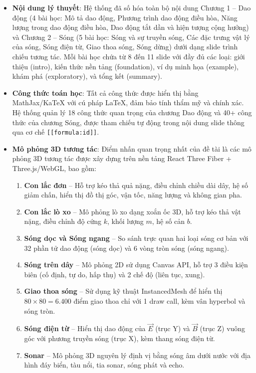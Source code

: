 \begin{itemize}
    \item \textbf{Nội dung lý thuyết}: Hệ thống đã số hóa toàn bộ nội dung Chương 1 – Dao động (4 bài học: Mô tả dao động, Phương trình dao động điều hòa, Năng lượng trong dao động điều hòa, Dao động tắt dần và hiện tượng cộng hưởng) và Chương 2 – Sóng (5 bài học: Sóng và sự truyền sóng, Các đặc trưng vật lý của sóng, Sóng điện từ, Giao thoa sóng, Sóng dừng) dưới dạng slide trình chiếu tương tác. Mỗi bài học chứa từ 8 đến 11 slide với đầy đủ các loại: giới thiệu (intro), kiến thức nền tảng (foundation), ví dụ minh họa (example), khám phá (exploratory), và tổng kết (summary).
    
    \item \textbf{Công thức toán học}: Tất cả công thức được hiển thị bằng MathJax/KaTeX với cú pháp LaTeX, đảm bảo tính thẩm mỹ và chính xác. Hệ thống quản lý 18 công thức quan trọng của chương Dao động và 40+ công thức của chương Sóng, được tham chiếu tự động trong nội dung slide thông qua cơ chế \texttt{[[formula:id]]}.
    
    \item \textbf{Mô phỏng 3D tương tác}: Điểm nhấn quan trọng nhất của đề tài là các mô phỏng 3D tương tác được xây dựng trên nền tảng React Three Fiber + Three.js/WebGL, bao gồm:
    \begin{enumerate}
        \item \textbf{Con lắc đơn} – Hỗ trợ kéo thả quả nặng, điều chỉnh chiều dài dây, hệ số giảm chấn, hiển thị đồ thị góc, vận tốc, năng lượng và không gian pha.
        \item \textbf{Con lắc lò xo} – Mô phỏng lò xo dạng xoắn ốc 3D, hỗ trợ kéo thả vật nặng, điều chỉnh độ cứng $k$, khối lượng $m$, hệ số cản $b$.
        \item \textbf{Sóng dọc và Sóng ngang} – So sánh trực quan hai loại sóng cơ bản với 32 phần tử dao động (sóng dọc) và 6 vòng tròn sóng (sóng ngang).
        \item \textbf{Sóng trên dây} – Mô phỏng 2D sử dụng Canvas API, hỗ trợ 3 điều kiện biên (cố định, tự do, hấp thụ) và 2 chế độ (liên tục, xung).
        \item \textbf{Giao thoa sóng} – Sử dụng kỹ thuật InstancedMesh để hiển thị $80 \times 80 = 6.400$ điểm giao thoa chỉ với 1 draw call, kèm vân hyperbol và sóng tròn.
        \item \textbf{Sóng điện từ} – Hiển thị dao động của $\vec{E}$ (trục Y) và $\vec{B}$ (trục Z) vuông góc với phương truyền sóng (trục X), kèm thang sóng điện từ.
        \item \textbf{Sonar} – Mô phỏng 3D nguyên lý định vị bằng sóng âm dưới nước với địa hình đáy biển, tàu nổi, tia sonar, sóng phát và echo.
    \end{enumerate}
    

\end{itemize}
